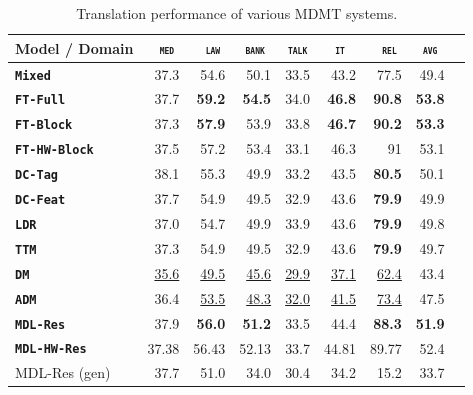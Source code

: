 \documentclass[11pt,a4paper]{article}
\newcommand{\fyDone}[1]{\done[FY]\Todo[FY:]{\textcolor{orange}{#1}}}
\newcommand{\domain}[1]{\texttt{\textsc{#1}}}
\newcommand{\system}[1]{\texttt{\textbf{#1}}}
\newcommand{\SB}[1]{\textbf{#1}}
\newcommand{\SW}[1]{\underline{#1}}
\begin{document}
\begin{table}[htbp]
  \centering
  \fyDone{Fix column size}
  \begin{tabular}{|p{3cm}|*{8}{r|}} \hline
    Model / Domain & \multicolumn{1}{c|}{\domain{ med}} & \multicolumn{1}{c|}{\domain{ law}} & \multicolumn{1}{c|}{\domain{bank}} & \multicolumn{1}{c|}{\domain{talk}} & \multicolumn{1}{c|}{\domain{ it }} & \multicolumn{1}{c|}{\domain{ rel}} & \multicolumn{1}{c|}{\domain{avg}} \\ \hline %
    \system{Mixed}  & 37.3 & 54.6 & 50.1 & 33.5 & 43.2 & 77.5  &  49.4 \\%
    \system{FT-Full}       & 37.7 & \SB{59.2} & \SB{54.5} & 34.0 & \SB{46.8} & \SB{90.8} &  \SB{53.8} \\
   \system{FT-Block}     & 37.3 & \SB{57.9} & 53.9 & 33.8 & \SB{46.7} & \SB{90.2}  &  \SB{53.3} \\ 
   \system{FT-HW-Block}   & 37.5 & 57.2 & 53.4 & 33.1 & 46.3 & 91 & 53.1 \\
   \hline 
    \system{DC-Tag}       & 38.1 & 55.3 & 49.9   & 33.2 & 43.5 & \SB{80.5}  & 50.1    \\
    \system{DC-Feat}      & 37.7  & 54.9 & 49.5   & 32.9 & 43.6 & \SB{79.9} & 49.9   \\
    \system{LDR}            & 37.0   & 54.7 & 49.9 & 33.9 & 43.6 & \SB{79.9} & 49.8          \\
    \system{TTM}            & 37.3 & 54.9 & 49.5 & 32.9 & 43.6 & \SB{79.9} & 49.7   \\
    \system{DM}             & \SW{35.6} & \SW{49.5}  & \SW{45.6}& \SW{29.9} & \SW{37.1} & \SW{62.4} & 43.4 \\ 
    \system{ADM}           & 36.4 & \SW{53.5}  & \SW{48.3} & \SW{32.0} & \SW{41.5} & \SW{73.4} & 47.5 \\
    \system{MDL-Res}     & 37.9 & \SB{56.0}  & \SB{51.2}   & 33.5   &  44.4  & \SB{88.3} & \SB{51.9} \\
    \system{MDL-HW-Res}   & 37.38&	56.43&	52.13&	33.7&	44.81&	89.77&	52.4 \\ 
    \hfill MDL-Res (gen)    & 37.7 & 51.0 & 34.0 & 30.4 & 34.2 & 15.2 & 33.7 \\
     \hline
  \end{tabular}
  \caption{Translation performance of various MDMT systems.}
  \label{tab:performance-multi}
\end{table}
\end{document}
